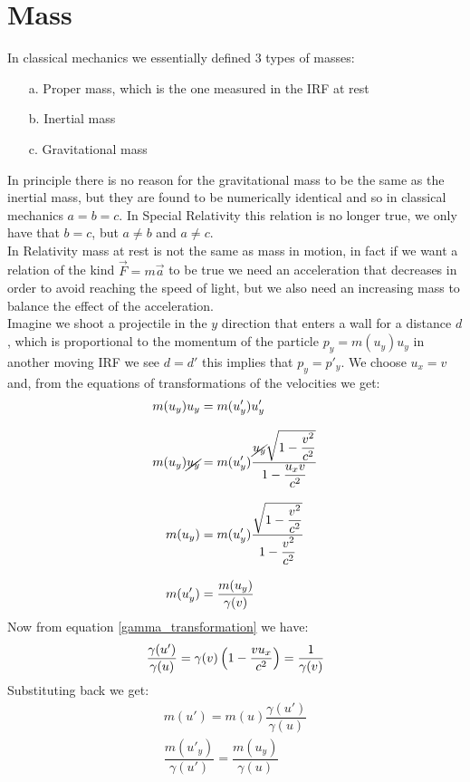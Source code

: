 \section{Mass}
In classical mechanics we essentially defined 3 types of masses:
\begin{itemize}
  \item[a.] Proper mass, which is the one measured in the IRF at rest
  \item[b.] Inertial mass
  \item[c.] Gravitational mass
\end{itemize}
In principle there is no reason for the gravitational mass to be the same as the inertial mass, but they are found to be numerically identical and so in classical mechanics $a = b = c$. In Special Relativity this relation is no longer true, we only have that $b = c$, but $a \neq b$ and $a \neq c$.\\
In Relativity mass at rest is not the same as mass in motion, in fact if we want a relation of the kind $\vec{F} = m\vec{a}$ to be true we need an acceleration that decreases in order to avoid reaching the speed of light, but we also need an increasing mass to balance the effect of the acceleration.\\
Imagine we shoot a projectile in the $y$ direction that enters a wall for a distance $d$, which is proportional to the momentum of the particle $p_y = m(u_y)u_y$ in another moving IRF we see $d=d'$ this implies that $p_y = p'_y$. We choose $u_x = v$ and, from the equations of transformations of the velocities we get:
\begin{equation}
  \begin{split}
    m(u_y)u_y &= m(u'_y)u'_y \\[8pt]
    m(u_y)\cancel{u_y} &= m(u'_y)\dfrac{\cancel{u_y}\sqrt{1-\dfrac{v^2}{c^2}}}{1-\dfrac{u_x v}{c^2}} \\[8pt]
    m(u_y) &= m(u'_y)\dfrac{\sqrt{1-\dfrac{v^2}{c^2}}}{1-\dfrac{v^2}{c^2}} \\[8pt]
    m(u'_y) &= \dfrac{m(u_y)}{\gamma(v)}
  \end{split}
\end{equation}
Now from equation \eqref{gamma_transformation} we have:
\begin{equation}
  \dfrac{\gamma(u')}{\gamma(u)} = \gamma(v)\left(1-\dfrac{v u_x}{c^2}\right) = \dfrac{1}{\gamma(v)}
\end{equation}
Substituting back we get:
\begin{equation}
  \begin{split}
    m(u') = m(u)\dfrac{\gamma(u')}{\gamma(u)} \\[8pt]
    \boxed{\dfrac{m(u'_y)}{\gamma(u')} = \dfrac{m(u_y)}{\gamma(u)}}
  \end{split}
\end{equation}

